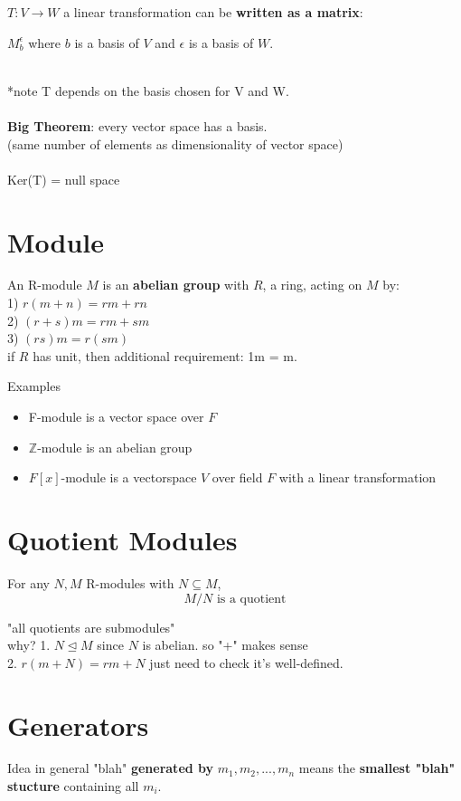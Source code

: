 \documentclass[12pt]{article}
\def\Z{\ensuremath{\mathbb{Z}}}
\newcommand{\bt}[1]{\textbf{#1}} %
\begin{document}
$T: V \rightarrow W$ a linear transformation can be \bt{written as a matrix}: \\
\centerline{$M_{b}^\epsilon$ where $b$ is a basis of $V$ and $\epsilon$ is a basis of $W$. }\\

*note T depends on the basis chosen for V and W. \\
 \ \\


\bt{Big Theorem}: every vector space has a basis.\\
(same number of elements as dimensionality of vector space)\\
\ \\

Ker(T) = null space

\section*{Module}

An R-module $M$ is an \bt{abelian group} with $R$, a ring, acting on $M$ by: \\
1) $r(m+n) = rm + rn$\\
2) $(r+s) m = rm + sm$\\
3) $(rs)m = r(sm)$\\

\noindent *if $R$ has unit, then additional requirement: 1m = m.

Examples
\begin{itemize}
    \item F-module is a vector space over $F$ 
    \item $\Z$-module is an abelian group
    \item $F[x]$-module is a vectorspace $V$ over field $F$ with a linear transformation
\end{itemize}


\section*{Quotient Modules}
For any $N, M$ R-modules with $N \subseteq M$, 
$$M / N \text{ is a quotient}$$

"all quotients are submodules"\\
why? 
\textcolor[gray]{0.5}{
1. $N \trianglelefteq M$ since $N$ is abelian. so "+" makes sense\\
2. $r(m + N) = rm + N$ just need to check it's well-defined.
}

\section*{Generators}
Idea in general "blah" \bt{generated by} $m_1, m_2, ..., m_n$ means the \bt{smallest "blah" stucture} containing all $m_i$.\\
\end{document}

